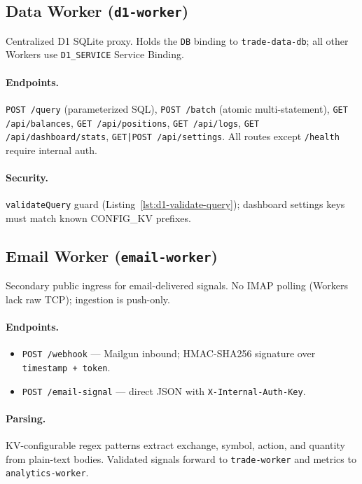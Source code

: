 \subsection{Data Worker (\texttt{d1-worker})}

Centralized D1 SQLite proxy. Holds the \texttt{DB} binding to \texttt{trade-data-db}; all other Workers use \texttt{D1\_SERVICE} Service Binding.

\paragraph{Endpoints.} \texttt{POST /query} (parameterized SQL), \texttt{POST /batch} (atomic multi-statement), \texttt{GET /api/balances}, \texttt{GET /api/positions}, \texttt{GET /api/logs}, \texttt{GET /api/dashboard/stats}, \texttt{GET|POST /api/settings}. All routes except \texttt{/health} require internal auth.

\paragraph{Security.} \texttt{validateQuery} guard (Listing~\ref{lst:d1-validate-query}); dashboard settings keys must match known CONFIG\_KV prefixes.

\subsection{Email Worker (\texttt{email-worker})}

Secondary public ingress for email-delivered signals. No IMAP polling (Workers lack raw TCP); ingestion is push-only.

\paragraph{Endpoints.}
\begin{itemize}
  \item \texttt{POST /webhook} --- Mailgun inbound; HMAC-SHA256 signature over \texttt{timestamp + token}.
  \item \texttt{POST /email-signal} --- direct JSON with \texttt{X-Internal-Auth-Key}.
\end{itemize}

\paragraph{Parsing.} KV-configurable regex patterns extract exchange, symbol, action, and quantity from plain-text bodies. Validated signals forward to \texttt{trade-worker} and metrics to \texttt{analytics-worker}.

